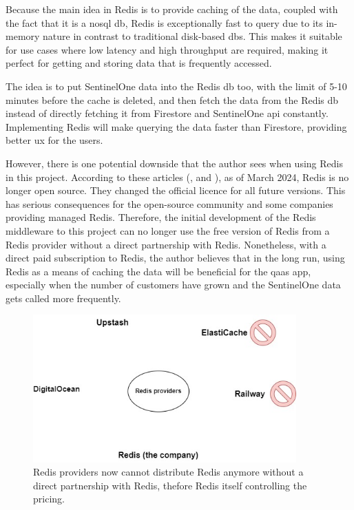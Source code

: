 Because the main idea in Redis is to provide caching of the data, coupled with the fact that it is a \acrshort{nosql} \acrshort{db},
Redis is exceptionally fast to query due to its in-memory nature in contrast to traditional disk-based \acrshort{db}s. This makes it
suitable for use cases where low latency and high throughput are required, making it perfect for getting and storing data that is
frequently accessed.

The idea is to put SentinelOne data into the Redis \acrshort{db} too, with the limit of 5-10 minutes before the cache is deleted,
and then fetch the data from the Redis \acrshort{db} instead of directly fetching it from Firestore and SentinelOne \acrshort{api}
constantly. Implementing Redis will make querying the data faster than Firestore, providing better \acrshort{ux} for the users.

However, there is one potential downside that the author sees when using Redis in this project. According to these articles
(\textit{\cite{redisIsNoLongerFree}}, and \textit{\cite{redisMomento}}), as of March 2024, Redis is no  longer open source. They
changed the official licence for all future versions. This has serious consequences for the open-source community and some companies
providing managed Redis. Therefore, the initial development of the Redis middleware to this project can no longer use the free version
of Redis from a Redis provider without a direct partnership with Redis. Nonetheless, with a direct paid subscription to Redis, the
author believes that in the long run, using Redis as a means of caching the data will be beneficial for the \acrshort{qaas} app,
especially when the number of customers have grown and the SentinelOne data gets called more frequently.



\begin{figure}[htbp]
  \centering
  \includegraphics[width=0.9\textwidth]{Figures/Redis Providers.jpg}
  \caption{Redis providers now cannot distribute Redis anymore without a direct partnership with Redis, thefore Redis itself controlling
    the pricing.}
\end{figure}


